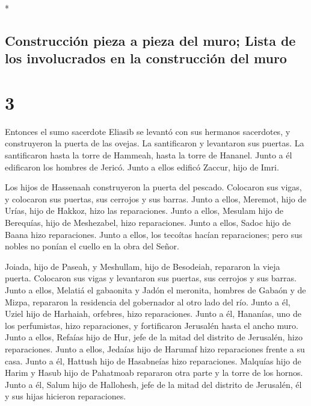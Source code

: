 \begin{paracol}{2}
\begin{otherlanguage}{english}
\end{otherlanguage}

\switchcolumn[0]*

\hypertarget{construcciuxf3n-pieza-a-pieza-del-muro-lista-de-los-involucrados-en-la-construcciuxf3n-del-muro}{%
\subsection{Construcción pieza a pieza del muro; Lista de los
involucrados en la construcción del
muro}\label{construcciuxf3n-pieza-a-pieza-del-muro-lista-de-los-involucrados-en-la-construcciuxf3n-del-muro}}

\hypertarget{section-4}{%
\section{3}\label{section-4}}

 Entonces el sumo sacerdote Eliasib se levantó con sus
hermanos sacerdotes, y construyeron la puerta de las ovejas. La
santificaron y levantaron sus puertas. La santificaron hasta la torre de
Hammeah, hasta la torre de Hananel.  Junto a él edificaron
los hombres de Jericó. Junto a ellos edificó Zaccur, hijo de Imri.

 Los hijos de Hassenaah construyeron la puerta del
pescado. Colocaron sus vigas, y colocaron sus puertas, sus cerrojos y
sus barras.  Junto a ellos, Meremot, hijo de Urías, hijo
de Hakkoz, hizo las reparaciones. Junto a ellos, Mesulam hijo de
Berequías, hijo de Meshezabel, hizo reparaciones. Junto a ellos, Sadoc
hijo de Baana hizo reparaciones.  Junto a ellos, los
tecoítas hacían reparaciones; pero sus nobles no ponían el cuello en la
obra del Señor.

 Joiada, hijo de Paseah, y Meshullam, hijo de Besodeiah,
repararon la vieja puerta. Colocaron sus vigas y levantaron sus puertas,
sus cerrojos y sus barras.  Junto a ellos, Melatiá el
gabaonita y Jadón el meronita, hombres de Gabaón y de Mizpa, repararon
la residencia del gobernador al otro lado del río.  Junto
a él, Uziel hijo de Harhaiah, orfebres, hizo reparaciones. Junto a él,
Hananías, uno de los perfumistas, hizo reparaciones, y fortificaron
Jerusalén hasta el ancho muro.  Junto a ellos, Refaías
hijo de Hur, jefe de la mitad del distrito de Jerusalén, hizo
reparaciones.  Junto a ellos, Jedaías hijo de Harumaf
hizo reparaciones frente a su casa. Junto a él, Hattush hijo de
Hasabneías hizo reparaciones.  Malquías hijo de Harim y
Hasub hijo de Pahatmoab repararon otra parte y la torre de los hornos.
 Junto a él, Salum hijo de Hallohesh, jefe de la mitad
del distrito de Jerusalén, él y sus hijas hicieron reparaciones.


\end{paracol}
